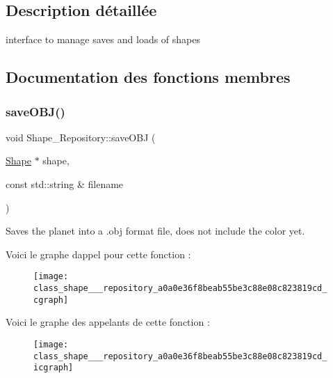 \subsection{Description détaillée}
interface to manage saves and loads of shapes 

\subsection{Documentation des fonctions membres}
\mbox{\label{class_shape___repository_a0a0e36f8beab55be3c88e08c823819cd}} 
\subsubsection{\texorpdfstring{save\+O\+B\+J()}{saveOBJ()}}
{\footnotesize\ttfamily void Shape\+\_\+\+Repository\+::save\+O\+BJ (\begin{DoxyParamCaption}\item[{\hyperlink{class_shape}{Shape} $\ast$}]{shape,  }\item[{const std\+::string \&}]{filename }\end{DoxyParamCaption})\hspace{0.3cm}{\ttfamily [static]}}



Saves the planet into a .obj format file, does not include the color yet. 

Voici le graphe d\textquotesingle{}appel pour cette fonction \+:
\nopagebreak
\begin{figure}[H]
\begin{center}
\leavevmode
\texttt{[image: class\_shape\_\_\_repository\_a0a0e36f8beab55be3c88e08c823819cd\_cgraph]}
\end{center}
\end{figure}
Voici le graphe des appelants de cette fonction \+:
\nopagebreak
\begin{figure}[H]
\begin{center}
\leavevmode
\texttt{[image: class\_shape\_\_\_repository\_a0a0e36f8beab55be3c88e08c823819cd\_icgraph]}
\end{center}
\end{figure}
\mbox{\label{class_shape___repository_ad52141b6883d20084a0105355f2271b5}} 
